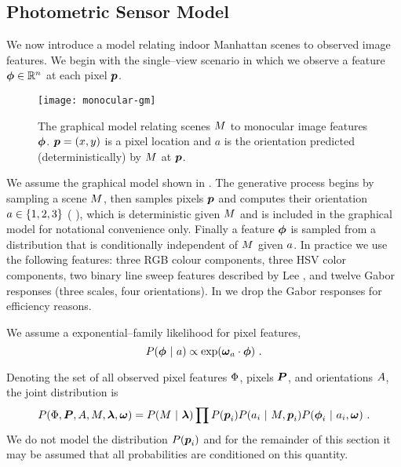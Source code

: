 \subsection{Photometric Sensor Model}

We now introduce a model relating indoor Manhattan scenes to observed
image features. We begin with the single--view scenario in which we
observe a feature $\Feature\in\Reals^n$ at each pixel $\Pixel$.

\begin{figure}[tb]
  \centering
  \texttt{[image: monocular-gm]}
  \caption{The graphical model relating scenes $\Scene$ to monocular
    image features $\Feature$. $\Pixel=(x,y)$ is a pixel location and
    $a$ is the orientation predicted (deterministically) by $\Scene$
    at $\Pixel$.}
  \label{fig:photometric-gm}
\end{figure}

We assume the graphical model shown in . The
generative process begins by sampling a scene $\Scene$, then samples
pixels $\Pixel$ and computes their orientation
$\Orient\in\Orientations$ (\cf
{}), which is deterministic given $\Scene$
and is included in the graphical model for notational convenience
only. Finally a feature $\Feature$ is sampled from a distribution that
is conditionally independent of $\Scene$ given $\Orient$. In practice
we use the following features: three RGB colour components,
three HSV color components, two binary line sweep features described
by Lee \etal \cite{Lee09}, and twelve Gabor responses (three scales,
four orientations). In  we drop the
Gabor responses for efficiency reasons.\changedsinceviva

We assume a exponential--family likelihood for pixel features,
\begin{equation}
  \label{eq:pixel-likelihood}
  P(\Feature ~|~ \Orient) \propto
    \exp(\PixelModel_\Orient \cdot \Feature) ~.
\end{equation}

Denoting the set of all observed pixel
features $\Features$, pixels $\Pixels$, and orientations $\Orients$,
the joint distribution is
\begin{equation}
  P(\Features, \Pixels, \Orients, \Scene, \Penalties, \PixelModel) =
    P(\Scene ~|~ \Penalties) 
    \prod P(\Pixel_i)
          P(\Orient_i ~|~ \Scene, \Pixel_i)
          P(\Feature_i ~|~ \Orient_i, \PixelModel) ~.
\end{equation}
We do not model the distribution $P(\Pixel_i)$ and for the remainder
of this section it may be assumed that all probabilities are
conditioned on this quantity.

